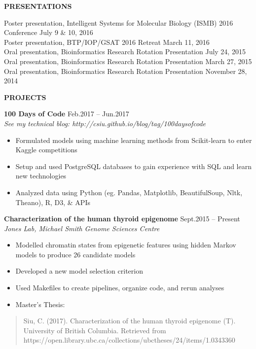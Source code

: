 \documentclass{res}
\renewcommand{\section}[1]{%
  \vspace{0.3in}%
  \centerline{\uppercase{\bf{#1}}}%
  \vspace{-6pt}}
\newcommand{\linepresentation}[3]{%
  #3 \hfill #1\\[.75ex]}
\newcommand{\linehead}[2]{%
  {\bf #1} \hfill #2\\}
\newcommand{\linetitle}[1]{%
  {\sl #1}}
\begin{document}
\begin{resume}
\section{Presentations}

\linepresentation{July 9 \& 10, 2016}{%
  Bioinformatic characterization of the normal thyroid reference epigenome}{%
  Poster presentation, Intelligent Systems for Molecular Biology (ISMB) 2016 Conference}
\linepresentation{March 11, 2016}{%
  Characterization of the normal reference thyroid epigenome}{%
  Poster presentation, BTP/IOP/GSAT 2016 Retreat}
\linepresentation{July 24, 2015}{%
  Literature-based knowledge discovery of Biomedical Text}{%
  Oral presentation, Bioinformatics Research Rotation Presentation}
\linepresentation{March 27, 2015}{%
  miRNA promoter recognition with CAGE and sRNA-seq}{%
  Oral presentation, Bioinformatics Research Rotation Presentation}
\linepresentation{November 28, 2014}{%
  Primer Data Extraction and Blast API}{%
  Oral presentation, Bioinformatics Research Rotation Presentation}
\vspace{-1.5em}

\section{Projects}
\linehead{100 Days of Code}{Feb.2017 -- Jun.2017}
\linetitle{See my technical blog: http://csiu.github.io/blog/tag/100daysofcode}
\begin{itemize}
  \item Formulated models using machine learning methods from Scikit-learn to enter Kaggle competitions
  \item Setup and used PostgreSQL databases to gain experience with SQL and learn new technologies
  \item Analyzed data using Python (eg. Pandas, Matplotlib, BeautifulSoup, Nltk, Theano), R, D3, \& APIs
\end{itemize}

\linehead{Characterization of the human thyroid epigenome}{Sept.2015 -- Present}
\linetitle{Jones Lab, Michael Smith Genome Sciences Centre}
\begin{itemize}
  \item Modelled chromatin states from epigenetic features using hidden Markov models to produce 26 candidate models
  \item Developed a new model selection criterion
  \item Used Makefiles to create pipelines, organize code, and rerun analyses
  \item Master's Thesis:
\end{itemize}
\begin{quotation}
  Siu, C. (2017). Characterization of the human thyroid epigenome (T). University of British Columbia. Retrieved from https://open.library.ubc.ca/collections/ubctheses/24/items/1.0343360
\end{quotation}


\end{resume}
\end{document}
